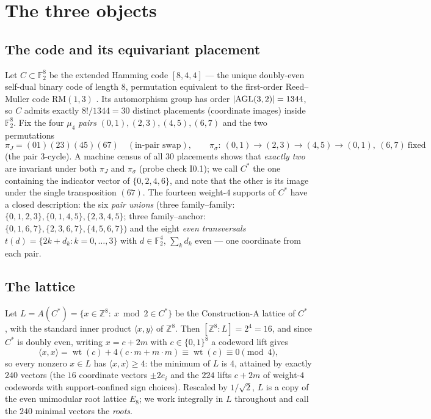 \documentclass[11pt,a4paper]{article}
\theoremstyle{remark}
\newcommand{\F}{\mathbb F}
\newcommand{\Z}{\mathbb Z}
\newcommand{\Cst}{C^{*}}
\newcommand{\ip}[2]{\langle #1,#2\rangle}
\DeclareMathOperator{\wt}{wt}
\begin{document}
\section{The three objects}\label{sec:setup}

\subsection{The code and its equivariant placement}
Let $C\subset\F_2^8$ be the extended Hamming code $[8,4,4]$ --- the
unique doubly-even self-dual binary code of length $8$, permutation
equivalent to the first-order Reed--Muller code $\mathrm{RM}(1,3)$
\cite[Ch.~1, 13--14]{MS77}.  Its automorphism group has order
$|{\rm AGL}(3,2)|=1344$, so $C$ admits exactly
$8!/1344=30$ distinct placements (coordinate images) inside $\F_2^8$.
Fix the four \emph{$\mu_4$ pairs}
$(0,1),(2,3),(4,5),(6,7)$ and the two permutations
\[
\pi_J=(01)(23)(45)(67)\quad(\text{in-pair swap}),\qquad
\pi_\sigma:\ (0,1)\to(2,3)\to(4,5)\to(0,1),\ (6,7)\ \text{fixed}
\]
(the pair $3$-cycle).  A machine census of all $30$ placements shows
that \emph{exactly two} are invariant under both $\pi_J$ and
$\pi_\sigma$ (probe check I0.1); we call $\Cst$ the one containing
the indicator vector of $\{0,2,4,6\}$, and note that the other is its
image under the single transposition $(67)$.  The fourteen weight-$4$
supports of $\Cst$ have a closed description: the six
\emph{pair unions} (three family--family:
$\{0,1,2,3\},\{0,1,4,5\},\{2,3,4,5\}$; three family--anchor:
$\{0,1,6,7\},\{2,3,6,7\},\{4,5,6,7\}$) and the eight \emph{even
transversals} $t(d)=\{2k+d_k:k=0,\dots,3\}$ with
$d\in\F_2^4$, $\sum_kd_k$ even --- one coordinate from each pair.

\subsection{The lattice}
Let $L=A(\Cst)=\{x\in\Z^8:\ x\bmod 2\in\Cst\}$ be the Construction-A
lattice of $\Cst$ \cite[Ch.~5]{CS99}, with the standard inner product
$\ip xy$ of $\Z^8$.  Then $[\Z^8:L]=2^4=16$, and since $\Cst$ is
doubly even, writing $x=c+2m$ with $c\in\{0,1\}^8$ a codeword lift
gives
\begin{equation}\label{eq:douleven}
\ip xx=\wt(c)+4(c\cdot m+m\cdot m)\equiv\wt(c)\equiv0 \pmod 4 ,
\end{equation}
so every nonzero $x\in L$ has $\ip xx\ge4$: the minimum of $L$ is
$4$, attained by exactly $240$ vectors (the $16$ coordinate vectors
$\pm2e_i$ and the $224$ lifts $c+2m$ of weight-$4$ codewords with
support-confined sign choices).  Rescaled by $1/\sqrt2$, $L$ is a copy
of the even unimodular root lattice $E_8$; we work integrally in $L$
throughout and call the $240$ minimal vectors the \emph{roots}.
\end{document}
